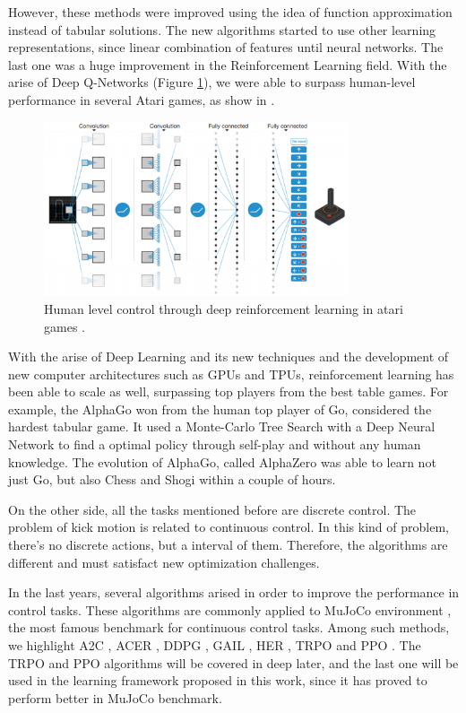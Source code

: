 However, these methods were improved using the idea of function approximation instead of tabular solutions. The new algorithms started to use other learning representations, since linear combination of features until neural networks. The last one was a huge improvement in the Reinforcement Learning field. With the arise of Deep Q-Networks (Figure \ref{dqn}), we were able to surpass human-level performance in several Atari games, as show in \cite{mnih2015humanlevel}.

\begin{figure}[ht!]
	\centering
	\includegraphics[width=0.8\textwidth]{Cap2/dqn.eps}
	\caption{Human level control through deep reinforcement learning in atari games
		\cite{mnih2015humanlevel}.}
	\label{dqn}
\end{figure}

With the arise of Deep Learning and its new techniques and the development of new computer architectures such as GPUs and TPUs, reinforcement learning has been able to scale as well, surpassing top players from the best table games. For example, the AlphaGo \cite{alphago} won from the human top player of Go, considered the hardest tabular game. It used a Monte-Carlo Tree Search with a Deep Neural Network to find a optimal policy through self-play and without any human knowledge. The evolution of AlphaGo, called AlphaZero \cite{alphazero} was able to learn not just Go, but also Chess and Shogi within a couple of hours.

On the other side, all the tasks mentioned before are discrete control. The problem of kick motion is related to continuous control. In this kind of problem, there's no discrete actions, but a interval of them. Therefore, the algorithms are different and must satisfact new optimization challenges.

In the last years, several algorithms arised in order to improve the performance in control tasks. These algorithms are commonly applied to MuJoCo environment \cite{mujoco}, the most famous benchmark for continuous control tasks. Among such methods, we highlight A2C \cite{a2c}, ACER \cite{acer}, DDPG \cite{ddpg}, GAIL \cite{gail}, HER \cite{her}, TRPO \cite{trpo} and PPO \cite{ppoalgorithm}. The TRPO and PPO algorithms will be covered in deep later, and the last one will be used in the learning framework proposed in this work, since it has proved to perform better in MuJoCo benchmark.

